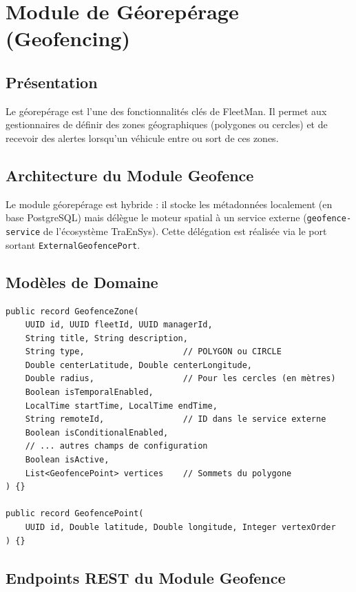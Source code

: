 \documentclass[12pt,a4paper]{report}
\begin{document}
\section{Module de Géorepérage (Geofencing)}

\subsection{Présentation}

Le géorepérage est l'une des fonctionnalités clés de FleetMan. Il permet aux gestionnaires de définir des zones géographiques (polygones ou cercles) et de recevoir des alertes lorsqu'un véhicule entre ou sort de ces zones.

\subsection{Architecture du Module Geofence}

Le module géorepérage est hybride : il stocke les métadonnées localement (en base PostgreSQL) mais délègue le moteur spatial à un service externe (\texttt{geofence-service} de l'écosystème TraEnSys). Cette délégation est réalisée via le port sortant \texttt{ExternalGeofencePort}.

\subsection{Modèles de Domaine}

\begin{lstlisting}[style=javaStyle, caption={Modèles GeofenceZone et GeofencePoint}]
public record GeofenceZone(
    UUID id, UUID fleetId, UUID managerId,
    String title, String description,
    String type,                    // POLYGON ou CIRCLE
    Double centerLatitude, Double centerLongitude,
    Double radius,                  // Pour les cercles (en mètres)
    Boolean isTemporalEnabled,
    LocalTime startTime, LocalTime endTime,
    String remoteId,                // ID dans le service externe
    Boolean isConditionalEnabled,
    // ... autres champs de configuration
    Boolean isActive,
    List<GeofencePoint> vertices    // Sommets du polygone
) {}

public record GeofencePoint(
    UUID id, Double latitude, Double longitude, Integer vertexOrder
) {}
\end{lstlisting}

\subsection{Endpoints REST du Module Geofence}
\end{document}
